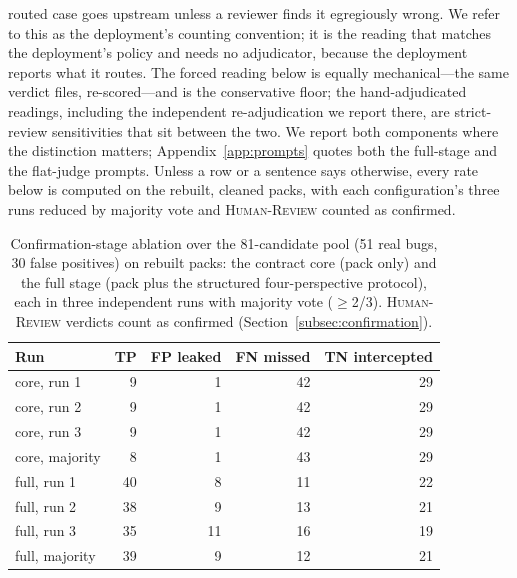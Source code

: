 \documentclass[acmsmall,screen,review,anonymous]{acmart}
\begin{document}
routed case goes upstream unless a reviewer finds it egregiously wrong. We refer to this as the deployment's counting convention; it is the reading that matches the deployment's policy and needs no adjudicator, because the deployment reports what it routes. The forced reading below is equally mechanical---the same verdict files, re-scored---and is the conservative floor; the hand-adjudicated readings, including the independent re-adjudication we report there, are strict-review sensitivities that sit between the two. We report both components where the distinction matters; Appendix~\ref{app:prompts} quotes both the full-stage and the flat-judge prompts. Unless a row or a sentence says otherwise, every rate below is computed on the rebuilt, cleaned packs, with each configuration's three runs reduced by majority vote and \textsc{Human-Review} counted as confirmed.

\begin{table}[t]
\caption{Confirmation-stage ablation over the 81-candidate pool (51 real bugs, 30 false positives) on rebuilt packs: the contract core (pack only) and the full stage (pack plus the structured four-perspective protocol), each in three independent runs with majority vote ($\geq$2/3). \textsc{Human-Review} verdicts count as confirmed (Section~\ref{subsec:confirmation}).}
\label{tab:rq2-matrix}
\small
\begin{tabular}{@{}lrrrr@{}}
\toprule
Run & TP & FP leaked & FN missed & TN intercepted \\
\midrule
core, run 1 & 9 & 1 & 42 & 29 \\
core, run 2 & 9 & 1 & 42 & 29 \\
core, run 3 & 9 & 1 & 42 & 29 \\
core, majority & 8 & 1 & 43 & 29 \\
\midrule
full, run 1 & 40 & 8 & 11 & 22 \\
full, run 2 & 38 & 9 & 13 & 21 \\
full, run 3 & 35 & 11 & 16 & 19 \\
full, majority & 39 & 9 & 12 & 21 \\
\bottomrule
\end{tabular}
\end{table}
\end{document}
